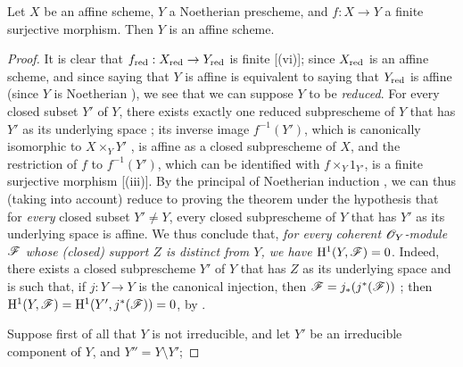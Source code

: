\begin{theorem}[6.7.1]
\label{II.6.7.1}
Let $X$ be an affine scheme, $Y$ a Noetherian prescheme, and $f:X\to Y$ a finite surjective morphism.
Then $Y$ is an affine scheme.
\end{theorem}

\begin{proof}
It is clear that $f_\red:X_\red\to Y_\red$ is finite [(vi)];
since $X_{\mathrm{red}}$ is an affine scheme, and since saying that $Y$ is affine is equivalent to saying that $Y_{\mathrm{red}}$ is affine (since $Y$ is Noetherian ), we see that we can suppose $Y$ to be \emph{reduced}.
For every closed subset $Y'$ of $Y$, there exists exactly one reduced subprescheme of $Y$ that has $Y'$ as its underlying space ;
its inverse image $f^{-1}(Y')$, which is canonically isomorphic to $X\times_Y Y'$ , is affine as a closed subprescheme of $X$, and the restriction of $f$ to $f^{-1}(Y')$, which can be identified with $f\times_Y 1_{Y'}$, is a finite surjective morphism [(iii)].
By the principal of Noetherian induction , we can thus (taking  into account) reduce to proving the theorem under the hypothesis that for \emph{every} closed subset $Y'\neq Y$, every closed subprescheme of $Y$ that has $Y'$ as its underlying space is affine.
We thus conclude that, \emph{for every coherent $\mathscr{O}_Y$-module $\mathscr{F}$ whose (closed) support $Z$ is distinct from $Y$, we have $\mathrm{H}^1(Y,\mathscr{F})=0$}.
Indeed, there exists a closed subprescheme $Y'$ of $Y$ that has $Z$ as its underlying space and is such that, if $j:Y\to Y$ is the canonical injection, then $\mathscr{F}=j_*(j^*(\mathscr{F}))$ ;
then  $\mathrm{H}^1(Y,\mathscr{F})=\mathrm{H}^1(Y',j^*(\mathscr{F}))=0$, by .

Suppose first of all that $Y$ is not irreducible, and let $Y'$ be an irreducible component of $Y$, and $Y''=Y\setminus Y'$;

\end{proof}
